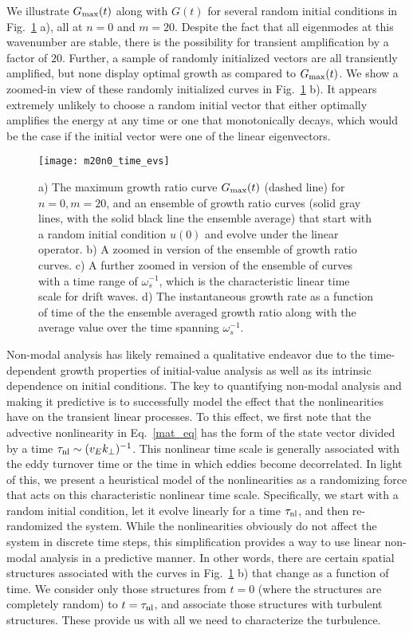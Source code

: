 \documentclass[showpacs,preprintnumbers,amsmath,amssymb,superscriptaddress,aip]{revtex4-1}
\begin{document}
We illustrate $G_{\rm{max}}(t)$ along with $G(t)$ for several random initial conditions in Fig.~\ref{m20n0_time_evs} a), all at $n=0$ and $m=20$. Despite the fact that all eigenmodes at this
wavenumber are stable, there is the possibility for transient amplification by a factor of $20$. Further, a sample of randomly initialized vectors are all transiently amplified, but none display
optimal growth as compared to $G_{\rm{max}}(t)$. We show a zoomed-in view of these randomly initialized curves in Fig.~\ref{m20n0_time_evs} b).
It appears extremely unlikely to choose a random initial vector that either optimally amplifies the energy at any time or one that monotonically decays, which would be the case
if the initial vector were one of the linear eigenvectors. 

\begin{figure}
\centerline{\texttt{[image: m20n0\_time\_evs]}}
\caption{a) The maximum growth ratio curve $G_{\rm{max}}(t)$ (dashed line) for $n=0,m=20$, and an ensemble of growth ratio curves (solid gray lines, with the solid black line the ensemble average)
that start with a random initial condition $u(0)$ and evolve under the linear operator. b) A zoomed in version of the ensemble of growth ratio curves. c) A further zoomed in version of the ensemble of
curves with a time range of $\omega_s^{-1}$, which is the characteristic linear time scale for drift waves. 
d) The instantaneous growth rate as a function of time of the the ensemble averaged growth ratio along with the average value over the time spanning $\omega_s^{-1}$.}
\label{m20n0_time_evs}
\end{figure}

Non-modal analysis has likely remained a qualitative endeavor due to the time-dependent growth properties of initial-value analysis as well as its intrinsic dependence on initial conditions.
The key to quantifying non-modal analysis and making it predictive is to successfully model the effect that the nonlinearities have on the transient linear processes. 
To this effect, we first note that the advective nonlinearity in Eq.~\ref{mat_eq} has the form of the state vector divided by a time $\tau_{\rm{nl}} \sim (v_E k_\perp)^{-1}$. This nonlinear
time scale is generally associated with the eddy turnover time or the time in which eddies become decorrelated. In light of this, we present a heuristical model of the nonlinearities 
as a randomizing force that acts on this characteristic nonlinear time scale.
Specifically, we start with a random initial condition, let it evolve linearly for a time $\tau_{\rm{nl}}$, and then re-randomized the system.
While the nonlinearities obviously do not affect the system in discrete time steps, this simplification provides a way to use linear non-modal analysis in a predictive manner.
In other words, there are certain spatial structures associated with the curves in Fig.~\ref{m20n0_time_evs} b) that change as a function of time. We consider only those structures from $t=0$ (where
the structures are completely random) to $t = \tau_{\rm{nl}}$, and associate those structures with turbulent structures. These provide us with all we need to characterize the turbulence.
\end{document}
